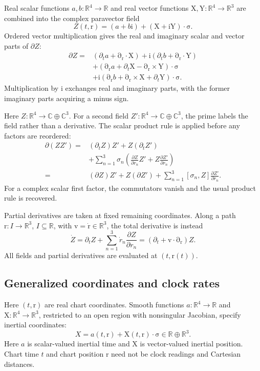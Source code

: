 \documentclass[11pt]{article}
\newcommand{\pv}[1]{{#1}}
\newcommand{\pvGreek}[1]{{#1}}
\newcommand{\vstyle}[1]{{\bm{\mathrm{#1}}}}
\newcommand{\pX}{\pv{X}}
\newcommand{\pZ}{\pv{Z}}
\newcommand{\pvpartial}{\pvGreek{\partial}}
\newcommand{\pvsigma}{\pvGreek{\sigma}}
\numberwithin{equation}{section}
\newcommand{\R}{\mathbb{R}}
\newcommand{\C}{\mathbb{C}}
\newcommand{\ii}{\mathrm{i}}
\newcommand{\dotprod}{\cdot}
\newcommand{\bsig}{\vstyle{\sigma}}
\newcommand{\bX}{\vstyle{X}}
\newcommand{\bY}{\vstyle{Y}}
\newcommand{\br}{\vstyle{r}}
\newcommand{\bv}{\vstyle{v}}
\newcommand{\pdr}{\vstyle{\partial}_{\br}}
\begin{document}
Real scalar functions $a,b:\R^4\to\R$ and
real vector functions $\bX,\bY:\R^4\to\R^3$ are combined into the complex
paravector field
\[
 \pZ(t,\br)=(a+b\ii)+(\bX+\ii\bY)\dotprod\bsig.
\]
Ordered vector multiplication gives the real and imaginary scalar and vector parts of $\pvpartial \pZ$:
\begin{equation*}
 \begin{aligned}
 \pvpartial \pZ={}&(\partial_ta+\pdr\dotprod\bX)
 +\ii(\partial_tb+\pdr\dotprod\bY)\\
 &+(\pdr a+\partial_t\bX-\pdr\times\bY)\dotprod\bsig\\
 &+\ii(\pdr b+\pdr\times\bX+\partial_t\bY)\dotprod\bsig.
 \end{aligned}
\end{equation*}
Multiplication by $\ii$ exchanges real and imaginary parts, with the
former imaginary parts acquiring a minus sign.

Here $\pZ:\R^4\to\C\oplus\C^3$. For a second field
$\pZ':\R^4\to\C\oplus\C^3$, the prime labels the
field rather than a derivative.  The scalar product rule is applied before
any factors are reordered:
\begin{align*}
 \pvpartial(\pZ \pZ')
 ={}&(\partial_t\pZ)\pZ'+\pZ(\partial_t\pZ')\\
 &+\sum_{n=1}^{3}\pvsigma_n
   \left(\frac{\partial \pZ}{\partial r_n}\pZ'
          +\pZ\frac{\partial \pZ'}{\partial r_n}\right)\\
 ={}&(\pvpartial \pZ)\pZ'+\pZ(\pvpartial \pZ')
    +\sum_{n=1}^{3}[\pvsigma_n,\pZ]\frac{\partial \pZ'}{\partial r_n}.
\end{align*}
For a complex scalar first factor, the commutators vanish and the usual
product rule is recovered.

Partial derivatives are taken at fixed remaining coordinates. Along a
path $\br:I\to\R^3$, $I\subseteq\R$, with $\bv=\dot\br\in\R^3$, the total derivative is instead
\[
 \dot\pZ=\partial_t\pZ
 +\sum_{n=1}^{3}\dot r_n\frac{\partial\pZ}{\partial r_n}
 =(\partial_t+\bv\dotprod\pdr)\pZ.
\]
All fields and partial derivatives are evaluated at $(t,\br(t))$.

\subsection{Generalized coordinates and clock rates}
\label{sec:generalized}

Here $(t,\br)$ are real chart coordinates. Smooth functions
$a:\R^4\to\R$ and $\bX:\R^4\to\R^3$, restricted to an open region
with nonsingular Jacobian, specify inertial coordinates:
\[
 \pX=a(t,\br)+\bX(t,\br)\dotprod\bsig\in\R\oplus\R^3.
\]
Here $a$ is scalar-valued inertial time and $\bX$ is
vector-valued inertial position. Chart time $t$ and chart position $\br$
need not be clock readings and Cartesian distances.
\end{document}
